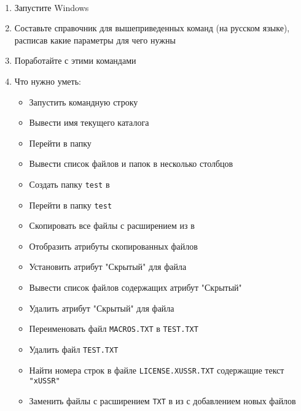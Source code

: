 \documentclass[a4paper,12pt]{article}
\begin{document}
    \begin{flushleft}
         \\[0.5em]
        \begin{enumerate}
            \item Запустите Windows
            \item Составьте справочник для вышеприведенных команд (на русском языке), расписав какие параметры для чего нужны
            \item Поработайте с этими командами
            \item Что нужно уметь:
            \begin{itemize}
                \item Запустить командную строку
                \item Вывести имя текущего каталога
                \item Перейти в папку 
                \item Вывести список файлов и папок  в несколько столбцов
                \item Создать папку \texttt{test} в 
                \item Перейти в папку \texttt{test}
                \item Скопировать все файлы с расширением  из  в 
                \item Отобразить атрибуты скопированных файлов
                \item Установить атрибут "Скрытый" для файла 
                \item Вывести список файлов содержащих атрибут "Скрытый"
                \item Удалить атрибут "Скрытый" для файла 
                \item Переименовать файл \texttt{MACROS.TXT} в \texttt{TEST.TXT}
                \item Удалить файл \texttt{TEST.TXT}
                \item Найти номера строк в файле \texttt{LICENSE.XUSSR.TXT} содержащие текст \texttt{"xUSSR"}
                \item Заменить файлы с расширением \texttt{TXT} в  из  с добавлением новых файлов

\end{itemize}
\end{enumerate}
\end{flushleft}
\end{document}
